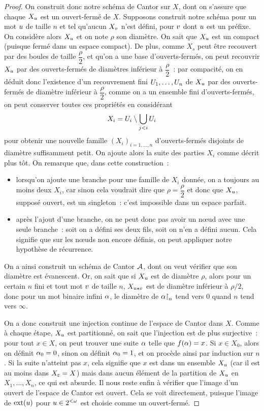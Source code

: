 \begin{proof}
  On construit donc notre schéma de Cantor sur $X$, dont on s'assure que
  chaque $X_u$ est un ouvert-fermé de $X$. Supposons construit notre schéma
  pour un mot $u$ de taille $n$ et tel qu'aucun $X_v$ n'est défini,
  pour $v$ dont $u$ est un préfixe. On considère alors $X_u$ et on
  note $\rho$ son diamètre. On sait que $X_u$ est un compact (puisque fermé
  dans un espace compact). De plus, comme $X_s$ peut être recouvert par des
  boules de taille $\dfrac{\rho}{2}$, et qu'on a une base d'ouverts-fermés, on
  peut recouvrir $X_u$ par des ouverts-fermés de diamètres inférieur à
  $\dfrac{\rho}{2}$~: par compacité, on en déduit donc l'existence d'un
  recouvrement fini $U_1,\ldots,U_n$ de $X_u$ par des
  ouverts-fermés de diamètre inférieur à $\dfrac{\rho}{2}$, comme on a un
  ensemble fini d'ouverts-fermés, on peut conserver toutes ces propriétés en
  considérant
  \[X_i = U_i \setminus \bigcup_{j < i} U_i\]
  pour obtenir une nouvelle famille $(X_i)_{i = 1,\ldots, n}$ d'ouverts-fermés
  disjoints de diamètre suffisamment petit. On ajoute alors la suite des
  parties $X_i$ comme décrit plus tôt. On remarque que, dans cette
  construction~:
  \begin{itemize}
  \item lorsqu'on ajoute une branche pour une famille de $X_i$ donnée, on
    a toujours au moins deux $X_i$, car sinon cela voudrait dire que
    $\rho = \dfrac{\rho}{2}$ et donc que $X_u$, supposé ouvert, est un
    singleton~: c'est impossible dans un espace parfait.
  \item après l'ajout d'une branche, on ne peut donc pas avoir un n\oe ud avec
    une seule branche~: soit on a défini ses deux fils, soit on n'en a
    défini aucun. Cela signifie que sur les n\oe uds non encore définis, on peut
    appliquer notre hypothèse de récurrence.
  \end{itemize}
  On a ainsi construit un schéma de Cantor $\mathcal A$, dont on veut vérifier que
  son diamètre est évanescent. Or, on sait que si $X_u$ est de diamètre
  $\rho$, alors pour un certain $n$ fini et tout mot $v$ de taille $n$,
  $X_{u\mathbin{\star}v}$ est de diamètre inférieur à $\rho/2$, donc pour un mot
  binaire infini $\alpha$, le diamètre de $\alpha\mathbin{\upharpoonright}_{n}$ tend vers $0$ quand
  $n$ tend vers $\infty$.

  On a donc construit une injection continue de l'espace de Cantor dans $X$.
  Comme à chaque étape, $X_u$ est partitionné, on sait que l'injection est
  de plus surjective~: pour tout $x \in X$, on peut trouver une suite $\alpha$
  telle que $f(\alpha) = x$. Si $x \in X_0$, alors on définit $\alpha_0 = 0$,
  sinon on définit $\alpha_0 = 1$, et on procède ainsi par induction sur $n$.
  Si la suite n'atteint pas $x$, cela signifie que $x$ est dans un ensemble
  $X_u$ (car il est au moins dans $X_\varepsilon = X$) mais dans aucun élément de la
  partition de $X_u$ en $X_1,\ldots,X_n$, ce qui est absurde. Il nous reste
  enfin à vérifier que l'image d'un ouvert de l'espace de Cantor est ouvert.
  Cela se voit directement, puisque l'image de $\operatorname{ext}(u)$ pour
  $u\in 2^{<\omega}$ est choisie comme un ouvert-fermé.


\end{proof}
